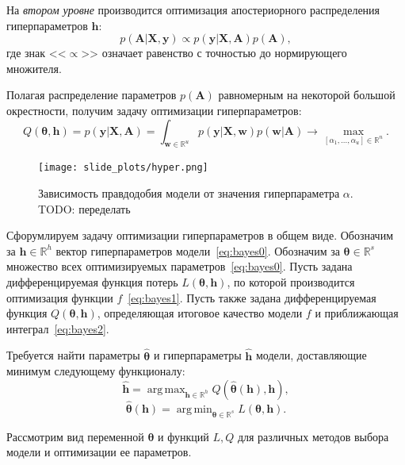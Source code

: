 \documentclass[12pt]{article}
\DeclareMathOperator*{\argmin}{arg\,min}
\DeclareMathOperator*{\argmax}{arg\,max}
\begin{document}
На \textit{втором уровне} производится оптимизация апостериорного распределения гиперпараметров $\mathbf{h}$:
\[
p(\mathbf{A}|\mathbf{X}, \mathbf{y}) \propto p(\mathbf{y}|\mathbf{X},\mathbf{A})p(\mathbf{A}),
\]
где знак <<$\propto$>> означает равенство с точностью до нормирующего множителя.

Полагая распределение параметров $p(\mathbf{A})$ равномерным на некоторой большой окрестности, получим задачу оптимизации гиперпараметров:
\begin{equation}
\label{eq:bayes2}
	Q(\boldsymbol{\theta}, \mathbf{h}) = p(\mathbf{y}|\mathbf{X},\mathbf{A}) = \int_{\mathbf{w} \in \mathbb{R}^u} p(\mathbf{y}|\mathbf{X}, \mathbf{w}) p(\mathbf{w}|\mathbf{A}) \to \max_{[\alpha_1, \dots, \alpha_u] \in \mathbb{R}^{n}}.
\end{equation}


\begin{figure}
  \texttt{[image: slide\_plots/hyper.png]}
\label{fig:hyper}
    \caption{Зависимость правдодобия модели от значения гиперпараметра $\alpha$. TODO: переделать}
 
   
    \end{figure}


Сфорумлируем задачу оптимизации гиперпараметров в общем виде. Обозначим за $\mathbf{h}  \in \mathbb{R}^h$ вектор гиперпараметров модели~\eqref{eq:bayes0}.   Обозначим за $\boldsymbol{\theta} \in \mathbb{R}^s$ множество всех оптимизируемых параметров~\eqref{eq:bayes0}. Пусть задана дифференцируемая функция потерь $L(\boldsymbol{\theta}, \mathbf{h})$, по которой производится оптимизация функции ${f}$~\eqref{eq:bayes1}. 
Пусть также задана дифференцируемая функция $Q(\boldsymbol{\theta}, \mathbf{h})$, определяющая итоговое качество модели ${f}$ и приближающая интеграл~\eqref{eq:bayes2}.

Требуется найти параметры $\hat{\boldsymbol{\theta}}$ и гиперпараметры $\hat{\mathbf{h}}$ модели, доставляющие минимум следующему функционалу:
\begin{equation}
\label{eq:main}
	\hat{\mathbf{h}} = \argmax_{\mathbf{h} \in \mathbb{R}^h} Q(\hat{\boldsymbol{\theta}}(\mathbf{h}), \mathbf{h}),
\end{equation}
\begin{equation}
\label{eq:main2}
	\hat{\boldsymbol{\theta}}(\mathbf{h}) =  \argmin_{\boldsymbol{\theta} \in \mathbb{R}^s} L(\boldsymbol{\theta}, \mathbf{h}).
\end{equation}

Рассмотрим вид переменной $\boldsymbol{\theta}$ и функций $L, Q$ для различных методов выбора модели и оптимизации ее параметров.
\end{document}
